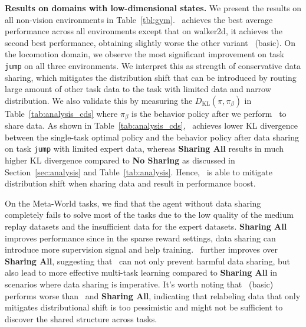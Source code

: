 \textbf{Results on domains with low-dimensional states.} We present the results on all non-vision environments in Table~\ref{tbl:gym}.
\cdsmethodname\ achieves the 
best average performance across all environments except that on walker2d, it achieves the second best performance, obtaining slightly worse the other variant \cdsmethodname\ (basic). On the locomotion domain, we observe the most 
significant improvement on task \texttt{jump} on all three environments. We interpret this as strength of conservative data sharing, which mitigates the distribution shift that can be introduced by routing large amount of other task data to the task with limited data and narrow distribution. We also validate this by measuring the $D_\text{KL}(\pi, \pi_\beta)$ in Table~\ref{tab:analysis_cds} where $\pi_\beta$ is the behavior policy after we perform \cdsmethodname\
to share data. As shown in Table~\ref{tab:analysis_cds}, \cdsmethodname\ achieves lower KL divergence
 between the single-task optimal policy and the behavior policy after data sharing on task \texttt{jump} with limited expert data, whereas \textbf{Sharing All} results in much higher KL divergence compared to \textbf{No Sharing} as discussed in Section~\ref{sec:analysis} and Table~\ref{tab:analysis}. Hence, \cdsmethodname\ is able to mitigate distribution shift when sharing data and result in performance boost.


On the Meta-World tasks, we find that the agent without data sharing completely fails to solve most of the tasks due to the low quality of the medium replay datasets and the insufficient data for the expert datasets. \textbf{Sharing All} improves performance since in the sparse reward settings, data sharing can introduce more supervision signal and help training. \cdsmethodname\ further improves over \textbf{Sharing All}, suggesting that \cdsmethodname\ can not only prevent harmful data sharing, but also lead to more effective multi-task learning compared to \textbf{Sharing All} in scenarios where data sharing is imperative. It's worth noting that \cdsmethodname\ (basic) performs worse than \cdsmethodname\ and \textbf{Sharing All}, indicating that relabeling data that only mitigates distributional shift is too pessimistic and might not be sufficient to discover the shared structure across tasks.

